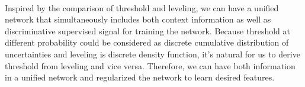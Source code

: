 \documentclass[12pt]{extarticle}
\begin{document}
\paragraph{}
Inspired by the comparison of threshold and leveling, we can have a unified network that simultaneously 
includes both context information as well as discriminative supervised signal for training the network. 
Because threshold at different probability could be considered as discrete cumulative distribution of uncertainties and 
leveling is discrete density function, it's natural for us to derive threshold from leveling and vice versa. Therefore, we 
can have both information in a unified network and regularized the network to learn desired features.




\end{document}
